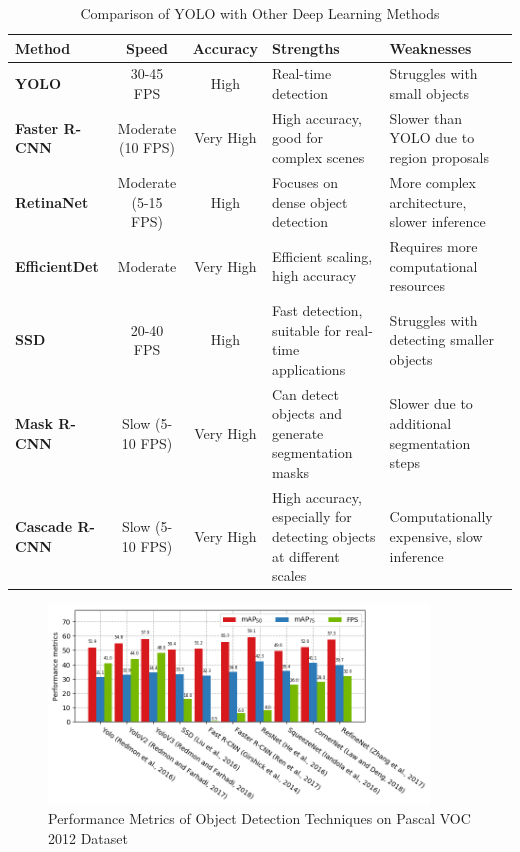 \begin{table}[H]
\centering
\caption{Comparison of YOLO with Other Deep Learning Methods}
\vspace{0.3cm} 
\begin{tabular}{|l|c|c|p{3.5cm}|p{3.5cm}|}
\hline
\textbf{Method}       & \textbf{Speed}         & \textbf{Accuracy} & \textbf{Strengths}                       & \textbf{Weaknesses}                          \\ \hline
\textbf{YOLO}         & 30-45 FPS              & High              & Real-time detection                      & Struggles with small objects                 \\ \hline
\textbf{Faster R-CNN} & Moderate (10 FPS)      & Very High         & High accuracy, good for complex scenes   & Slower than YOLO due to region proposals     \\ \hline
\textbf{RetinaNet}    & Moderate (5-15 FPS)    & High              & Focuses on dense object detection        & More complex architecture, slower inference  \\ \hline
\textbf{EfficientDet} & Moderate               & Very High         & Efficient scaling, high accuracy         & Requires more computational resources        \\ \hline
\textbf{SSD}          & 20-40 FPS              & High              & Fast detection, suitable for real-time applications & Struggles with detecting smaller objects     \\ \hline
\textbf{Mask R-CNN}   & Slow (5-10 FPS)        & Very High         & Can detect objects and generate segmentation masks & Slower due to additional segmentation steps  \\ \hline
\textbf{Cascade R-CNN}& Slow (5-10 FPS)        & Very High         & High accuracy, especially for detecting objects at different scales & Computationally expensive, slow inference    \\ \hline
\end{tabular}
\label{tab:yolo_vs_other_methods}
\end{table}
%
\begin{figure}[H]
    \centering
    \includegraphics[width=0.9\textwidth]{images/Yolo vs Other Models.png}
    \caption{Performance Metrics of Object Detection Techniques on Pascal VOC 2012 Dataset}
    \label{fig:performance_metrics}
\end{figure}
%
